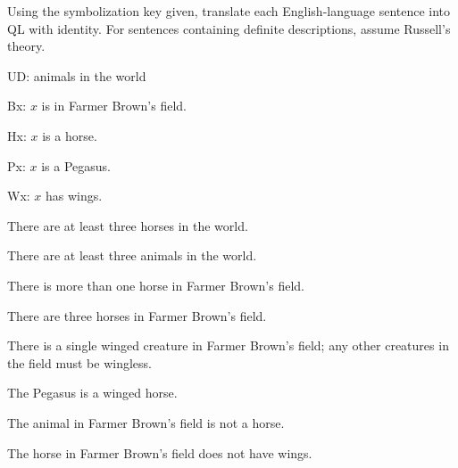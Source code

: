 \problempart Using the symbolization key given, translate each English-language sentence into QL with identity. For sentences containing definite descriptions, assume Russell's theory.
\begin{ekey}
\item[UD:] animals in the world
\item[Bx:] $x$ is in Farmer Brown's field.
\item[Hx:] $x$ is a horse.
\item[Px:] $x$ is a Pegasus.
\item[Wx:] $x$ has wings.
\end{ekey}
\begin{earg}
\item There are at least three horses in the world.
\item There are at least three animals in the world.
\item There is more than one horse in Farmer Brown's field.
\item There are three horses in Farmer Brown's field.
\item There is a single winged creature in Farmer Brown's field; any other creatures in the field must be wingless.
\item The Pegasus is a winged horse.
\item The animal in Farmer Brown's field is not a horse.
\item The horse in Farmer Brown's field does not have wings.
\end{earg}

